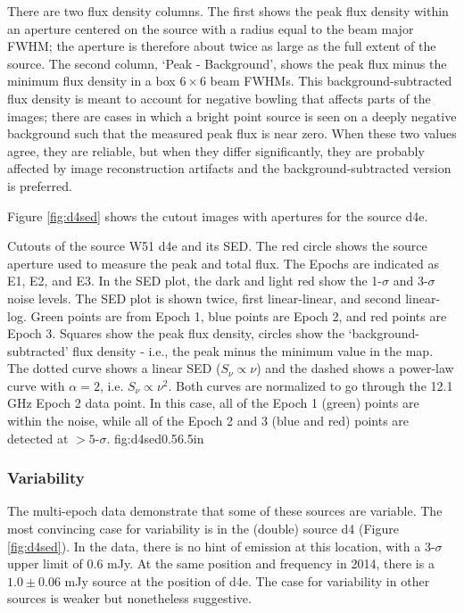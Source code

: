 There are two flux density columns.  The first shows the peak flux density
within an aperture centered on the source with a radius equal to the beam major
FWHM; the aperture is therefore about twice as large as the full extent of the
source.  The second column, `Peak - Background', shows the peak flux minus the
minimum flux density in a box $6\times6$ beam FWHMs.  This
background-subtracted flux density is meant to account for negative bowling
that affects parts of the images; there are cases in which a bright point
source is seen on a deeply negative background such that the measured peak flux
is near zero.  When these two values agree, they are reliable, but when they
differ significantly, they are probably affected by image reconstruction
artifacts and the background-subtracted version is preferred.



Figure \ref{fig:d4sed} shows the cutout images with apertures for the source
d4e.  

{Cutouts of the source W51 d4e and its SED.
The red circle shows the source aperture used to measure the peak and total
flux.  The Epochs are indicated as E1, E2, and E3.
In the SED plot, the dark and light red show the 1-$\sigma$ and 3-$\sigma$
noise levels.  The SED plot is shown twice, first linear-linear, and second
linear-log.
Green points are from Epoch 1, blue points are Epoch 2, and red points are
Epoch 3.  Squares show the peak flux density, circles show the
`background-subtracted' flux density - i.e., the peak minus the minimum value
in the map.
The dotted curve shows a linear SED ($S_\nu \propto \nu$) and the dashed shows
a power-law curve with $\alpha=2$, i.e. $S_\nu \propto \nu^2$.  Both curves are
normalized to go through the 12.1 GHz Epoch 2 data point.  In this case, all of
the Epoch 1 (green) points are within the noise, while all of the Epoch 2 and 3
(blue and red) points are detected at $>5$-$\sigma$.
}
{fig:d4sed}{0.5}{6.5in}

\subsubsection{Variability}
The multi-epoch data demonstrate that some of these sources are variable.  The
most convincing case for variability is in the (double) source d4 (Figure
\ref{fig:d4sed}).  In the \citet{Mehringer1994a} data, there is no hint of
emission at this location, with a 3-$\sigma$ upper limit of 0.6 mJy.  At the
same position and frequency in 2014, there is a $1.0 \pm 0.06$ mJy source at
the position of d4e.  The case for variability in other sources is weaker but
nonetheless suggestive.


